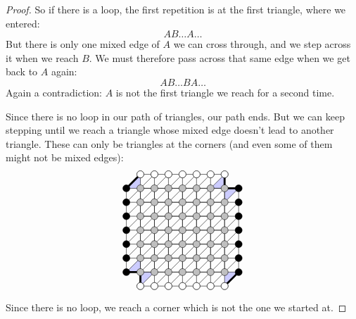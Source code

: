 \begin{proof}
So if there is a loop, the first repetition is at the first triangle, where we entered:
\[
AB\dots A\dots 
\]
But there is only one mixed edge of \(A\) we can cross through, and we step across it when we reach \(B\).
We must therefore pass across that same edge when we get back to \(A\) again:
\[
AB\dots BA\dots 
\]
Again a contradiction: \(A\) is not the first triangle we reach for a second time.

Since there is no loop in our path of triangles, our path ends.
But we can keep stepping until we reach a triangle whose mixed edge doesn't lead to another triangle.
These can only be triangles at the corners (and even some of them might not be mixed edges): 
\[
\begin{tikzpicture}[scale=.5]
\fill[blue!20] (6,-1) -- (7,0) -- (6,0) -- cycle;
\draw[line width=2pt] (6,-1) -- (7,0);
\fill[blue!20] (-1,6) -- (0,7) -- (0,6) -- cycle;
\draw[line width=2pt] (-1,6) -- (0,7);
\fill[blue!20] (0,-1) -- (1,0) -- (0,0) -- cycle;
\draw[line width=2pt] (0,-1) -- (0,0);
\fill[blue!20] (-1,0) -- (0,1) -- (0,0) -- cycle;
\draw[line width=2pt] (-1,0) -- (0,0);
\fill[blue!20] (6,6) -- (6,7) -- (5,6) -- cycle;
\draw[line width=2pt] (6,6) -- (6,7);
\fill[blue!20] (6,6) -- (7,6) -- (6,5) -- cycle;
\draw[line width=2pt] (6,6) -- (7,6);
\draw (-1,0) grid (7,6);
\draw (0,-1) grid (6,7);
\foreach \i in {-1,...,6}
{
	\foreach \j in {0,...,5}
	{
		\draw (\i,\j) -- ({1+\i},{1+\j});
	}
}
\foreach \i in {0,...,6}
{
\draw ({\i-1},6) -- (\i,7);
\draw (\i,-1) -- ({\i+1},0);
}
\foreach \i in {0,...,6}
{
	\foreach \j in {-1,...,7}
	{
		\draw[black,fill=gray!50] (\i,\j) circle (.25cm);
	}
	\draw[black,fill=white] (\i,-1) circle (.25cm);
	\draw[black,fill=white] (\i,7) circle (.25cm);
	\draw[black,fill=black] (-1,\i) circle (.25cm);
	\draw[black,fill=black] (7,\i) circle (.25cm);
}
\end{tikzpicture}
\]
Since there is no loop, we reach a corner which is not the one we started at.


\end{proof}
